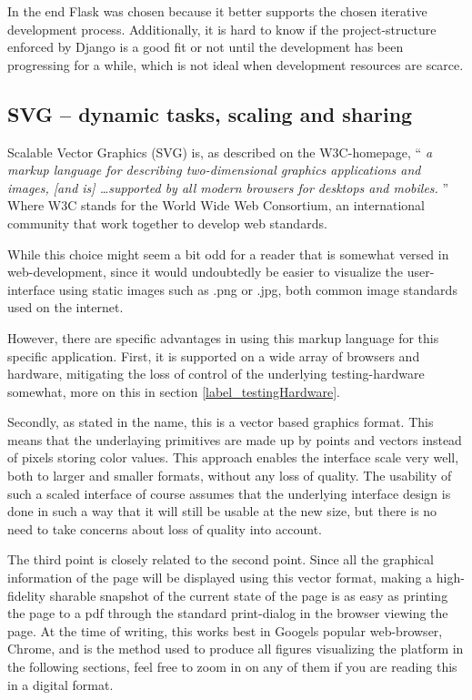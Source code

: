 {  In the end Flask was chosen because it better supports the chosen iterative
  development process. Additionally, it is hard to know if the
  project-structure enforced by Django is a good fit or not until the
  development has been progressing for a while, which is not ideal when
  development resources are scarce.

  \subsection{SVG -- dynamic tasks, scaling and
  sharing}\label{label_svg_section}

  Scalable Vector Graphics (SVG) is, as described on the W3C-homepage, ``%
  \textit{%
    a markup language for describing two-dimensional graphics applications and
    images, [and is] \ldots supported by all modern browsers for desktops and
    mobiles.%
  }''\cite{citeW3CSVG}
  Where W3C stands for the World Wide Web Consortium, an international
  community that work together to develop web standards\cite{citeW3CHomepage}.

  While this choice might seem a bit odd for a reader that is somewhat versed
  in web-development, since it would undoubtedly be easier to visualize the
  user-interface using static images such as .png or .jpg, both common image
  standards used on the internet.

  However, there are specific advantages in using this markup language for this
  specific application. First, it is supported on a wide array of browsers and
  hardware, mitigating the loss of control of the underlying testing-hardware
  somewhat, more on this in section \ref{label_testingHardware}.

  Secondly, as stated in the name, this is a vector based graphics format.
  This means that the underlaying primitives are made up by  points and vectors
  instead of pixels storing color values. This approach enables the interface
  scale very well, both to larger and smaller formats, without any loss of
  quality. The usability of such a scaled interface of course assumes that the
  underlying interface design is done in such a way that it will still be
  usable at the new size, but there is no need to take concerns about loss of
  quality into account.

  The third point is closely related to the second point. Since all the
  graphical information of the page will be displayed using this vector format,
  making a high-fidelity sharable snapshot of the current state of the page is
  as easy as printing the page to a pdf through the standard print-dialog in
  the browser viewing the page. At the time of writing, this works best
  in Googels popular web-browser, Chrome, and is the method used to produce all
  figures visualizing the platform in the following sections, feel free to zoom
  in on any of them if you are reading this in a digital format.

}
